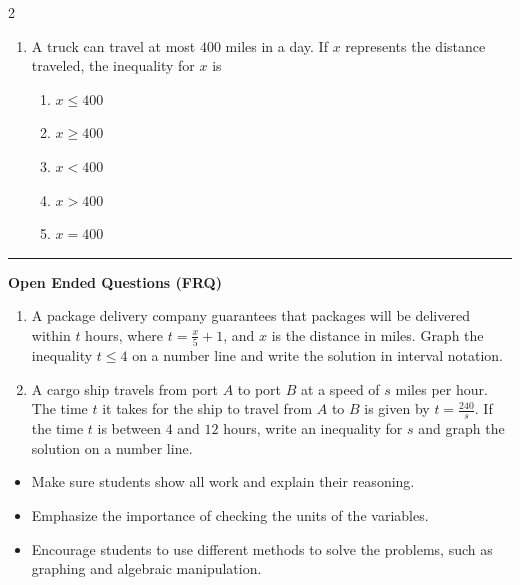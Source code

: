 \documentclass[10pt]{article}
\begin{document}
\begin{multicols}{2}
\begin{enumerate}[label=\textbf{Q\arabic*.}, leftmargin=*, itemsep=6pt, parsep=0pt]
  \item \small A truck can travel at most $400$ miles in a day. If $x$ represents the distance traveled, the inequality for $x$ is
  \begin{enumerate}[label=(\Alph*), leftmargin=0.6cm, nosep, itemsep=2pt]
    \item $x \leq 400$
    \item $x \geq 400$
    \item $x < 400$
    \item $x > 400$
    \item $x = 400$
  \end{enumerate}

\end{enumerate}
\end{multicols}

\vspace{-0.2cm}
\hrule
\vspace{0.2cm}
\textbf{\small Open Ended Questions (FRQ)}
\begin{enumerate}[label=\textbf{Q\arabic*.}, start=9, itemsep=5pt, topsep=0pt]

  \item \small A package delivery company guarantees that packages will be delivered within $t$ hours, where $t = \frac{x}{5} + 1$, and $x$ is the distance in miles. Graph the inequality $t \leq 4$ on a number line and write the solution in interval notation. \vspace{2cm}

  \item \small A cargo ship travels from port $A$ to port $B$ at a speed of $s$ miles per hour. The time $t$ it takes for the ship to travel from $A$ to $B$ is given by $t = \frac{240}{s}$. If the time $t$ is between $4$ and $12$ hours, write an inequality for $s$ and graph the solution on a number line. \vspace{2cm}

\end{enumerate}

\vfill

\begin{tcolorbox}[colback=blue!5, colframe=mainblue!50, title=\small \textbf{Chef's Tips}, fonttitle=\bfseries, bottom=1mm]
\begin{itemize}[noitemsep, topsep=2pt, leftmargin=0.5cm]
  \item \scriptsize Make sure students show all work and explain their reasoning.\item \scriptsize Emphasize the importance of checking the units of the variables.\item \scriptsize Encourage students to use different methods to solve the problems, such as graphing and algebraic manipulation.
\end{itemize}
\end{tcolorbox}
\end{document}
